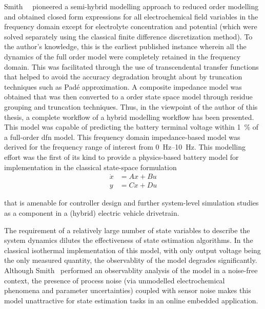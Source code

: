 Smith~\etal{}~\cite{Smith2007}  pioneered   a  semi-hybrid   modelling  approach
to  reduced  order  modelling  and  obtained closed  form  expressions  for  all
electrochemical field variables  in the frequency domain  except for electrolyte
concentration and  potential (which were  solved separately using  the classical
finite difference discretization method). To the author's knowledge, this is the
earliest  published  instance  wherein  all  the  dynamics  of  the  full  order
model were  completely retained  in the frequency  domain. This  was facilitated
through the  use of transcendental transfer  functions that helped to  avoid the
accuracy  degradation  brought about  by  truncation  techniques such  as  Padé
approximation. A composite impedance model  was obtained that was then converted
to  a   order state  space model  through residue  grouping and
truncation techniques.  Thus, in the viewpoint  of the author of  this thesis, a
complete workflow of a hybrid modelling  workflow has been presented. This model
was capable of  predicting the battery terminal  voltage within \SI{1}{\percent}
of a full-order \gls{dfn} model. This frequency domain impedance-based model was
derived for the  frequency range of interest  from \SIrange{0}{10}{\hertz}. This
modelling effort  was the first of  its kind to provide  a physics-based battery
model for implementation in the classical state-space formulation
\begin{equation}
    \begin{aligned}
        \dot{x} &= Ax + Bu \\
        y &= Cx + Du
    \end{aligned}
\end{equation}

that  is amenable  for  controller design  and  further system-level  simulation
studies \eg{} as a component in a (hybrid) electric vehicle drivetrain.

The requirement of a relatively large  number of state variables to describe the
system dynamics dilutes the effectiveness of state estimation algorithms. In the
classical  isothermal implementation  of this  model, with  only output  voltage
being  the  only measured  quantity,  the  observablity  of the  model  degrades
significantly. Although Smith~\etal{} performed  an observablity analysis of the
model in  a noise-free context,  the presence  of process noise  (via unmodelled
electrochemical phenomena and parameter uncertainties) coupled with sensor noise
makes this model  unattractive for state estimation tasks in  an online embedded
application.

